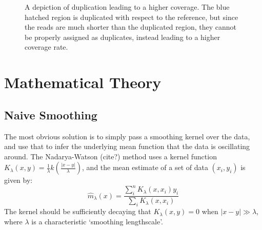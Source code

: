 \documentclass[fleqn,usenatbib]{mnras}
\begin{document}
\begin{figure}
\begin{center}
			\end{center}\caption{A depiction of duplication leading to a higher coverage. The blue hatched region is duplicated with respect to the reference, but since the reads are much shorter than the duplicated region, they cannot be properly assigned as duplicates, instead leading to a higher coverage rate.}\label{Fig:Diagram}
		\end{figure}

	\section{Mathematical Theory}

		\subsection{Naive Smoothing}

			The most obvious solution is to simply pass a smoothing kernel over the data, and use that to infer the underlying mean function that the data is oscillating around. The Nadarya-Watson (cite?) method uses a kernel function $K_\lambda(x,y) = \frac{1}{\lambda} k\left(\frac{|x-y|}{\lambda}\right)$, and the mean estimate of a set of data $(x_i,y_i)$ is given by:
			\begin{equation}
				\hat{m}_\lambda(x) = \frac{\sum_i^n K_\lambda(x,x_i) y_i}{\sum_i K_\lambda(x,x_i) }
			\end{equation}
			The kernel should be sufficiently decaying that $K_\lambda(x,y) = 0$ when $|x-y| \gg \lambda$, where $\lambda$ is a characteristic `smoothing lengthscale'.
\end{document}

